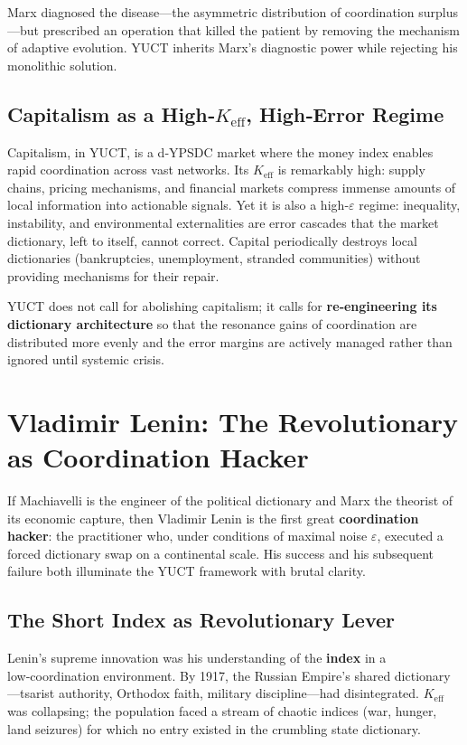 \documentclass[12pt,a4paper]{article}
\newcommand{\Keff}{K_{\mathrm{eff}}}
\begin{document}
	Marx diagnosed the disease—the asymmetric distribution of coordination surplus—but prescribed an operation that killed the patient by removing the mechanism of adaptive evolution. YUCT inherits Marx’s diagnostic power while rejecting his monolithic solution.
	
	\subsection{Capitalism as a High‑\(\Keff\), High‑Error Regime}
	
	Capitalism, in YUCT, is a d‑YPSDC market where the money index enables rapid coordination across vast networks. Its \(\Keff\) is remarkably high: supply chains, pricing mechanisms, and financial markets compress immense amounts of local information into actionable signals. Yet it is also a high‑\(\varepsilon\) regime: inequality, instability, and environmental externalities are error cascades that the market dictionary, left to itself, cannot correct. Capital periodically destroys local dictionaries (bankruptcies, unemployment, stranded communities) without providing mechanisms for their repair.
	
	YUCT does not call for abolishing capitalism; it calls for \textbf{re‑engineering its dictionary architecture} so that the resonance gains of coordination are distributed more evenly and the error margins are actively managed rather than ignored until systemic crisis.
	
	\section{Vladimir Lenin: The Revolutionary as Coordination Hacker}
	\label{sec:lenin}
	
	If Machiavelli is the engineer of the political dictionary and Marx the theorist of its economic capture, then Vladimir Lenin is the first great \textbf{coordination hacker}: the practitioner who, under conditions of maximal noise \(\varepsilon\), executed a forced dictionary swap on a continental scale. His success and his subsequent failure both illuminate the YUCT framework with brutal clarity.
	
	\subsection{The Short Index as Revolutionary Lever}
	
	Lenin’s supreme innovation was his understanding of the \textbf{index} in a low‑coordination environment. By 1917, the Russian Empire’s shared dictionary—tsarist authority, Orthodox faith, military discipline—had disintegrated. \(\Keff\) was collapsing; the population faced a stream of chaotic indices (war, hunger, land seizures) for which no entry existed in the crumbling state dictionary.
	
\end{document}

